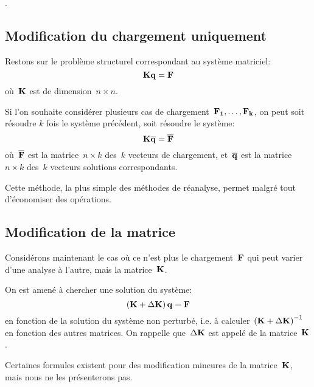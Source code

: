 \medskip
{}.


\medskip
\subsection{Modification du chargement uniquement}

Restons sur le problème structurel correspondant au système matriciel:
\begin{equation}
\MM{K} \VV{q} = \VV{F}
\end{equation}
où~$\MM{K}$ est de dimension~$n\times n$.

\medskip
Si l'on souhaite considérer plusieurs cas de chargement~$\VV{F_1},\ldots,\VV{F_k}$, on peut soit résoudre $k$ fois le système précédent, soit résoudre le système:
\begin{equation}
\MM{K} \MM{\overline{q}} =\MM{\overline{F}}
\end{equation}
où~$\MM{\overline{F}}$ est la matrice~$n\times k$ des~$k$ vecteurs de chargement, et~$\MM{\overline{q}}$ est la
matrice~$n\times k$ des~$k$ vecteurs solutions correspondants.

\medskip
Cette méthode, la plus simple des méthodes de réanalyse, permet malgré tout d'économiser des opérations.


\medskip
\subsection{Modification de la matrice}

Considérons maintenant le cas où ce n'est plus le chargement~$\VV{F}$ qui peut varier d'une analyse à l'autre, mais la matrice~$\MM{K}$.

On est amené à chercher une solution du système:
\begin{equation}
\left(\MM{K}+\Delta\MM{ K}\right)\VV{q}=\VV{F}
\end{equation}
en fonction de la solution du système non perturbé, i.e. à calculer~$\left(\MM{K}+\Delta\MM{K}\right)^{-1}$ en fonction des autres matrices. On rappelle que~$\Delta\MM{ K}$ est appelé   de la matrice~$\MM{K}$.

Certaines formules existent pour des modification mineures de la matrice~$\MM{K}$, mais nous ne les présenterons pas.

